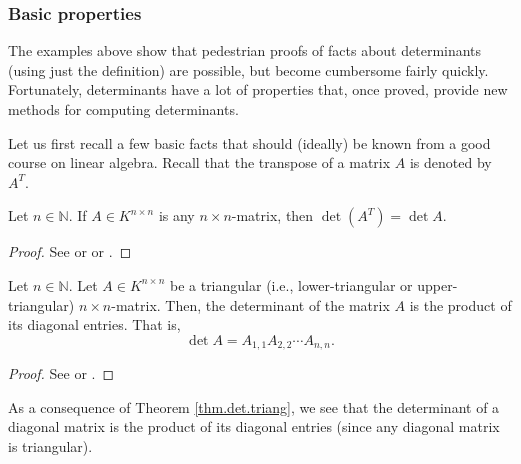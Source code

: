 \subsubsection{Basic properties}

The examples above show that pedestrian proofs of facts about determinants
(using just the definition) are possible, but become cumbersome fairly
quickly. Fortunately, determinants have a lot of properties that, once proved,
provide new methods for computing determinants.

Let us first recall a few basic facts that should (ideally) be known from a
good course on linear algebra. Recall that the transpose of a matrix $A$ is
denoted by $A^{T}$.

\begin{theorem}
\label{thm.det.transp}Let $n\in\mathbb{N}$.
If $A\in K^{n\times n}$ is any $n\times n$-matrix, then $\det\left(
A^{T}\right)  =\det A$.
\end{theorem}

\begin{proof}
See \cite[Corollary B.16]{Strick13} or \cite[Exercise 6.4]{detnotes} or
\cite[\S 5.3.2]{Laue-det}.
\end{proof}

\begin{theorem}
\label{thm.det.triang}Let $n\in
\mathbb{N}$. Let $A\in K^{n\times n}$ be a triangular (i.e., lower-triangular
or upper-triangular) $n\times n$-matrix. Then, the determinant of the matrix
$A$ is the product of its diagonal entries. That is,%
\[
\det A=A_{1,1}A_{2,2}\cdots A_{n,n}.
\]

\end{theorem}

\begin{proof}
See \cite[Proposition B.11]{Strick13} or \cite[Exercise 6.3 and the paragraph
after Exercise 6.4]{detnotes}.
\end{proof}

As a consequence of Theorem \ref{thm.det.triang}, we see that the determinant
of a diagonal matrix is the product of its diagonal entries (since any
diagonal matrix is triangular).

